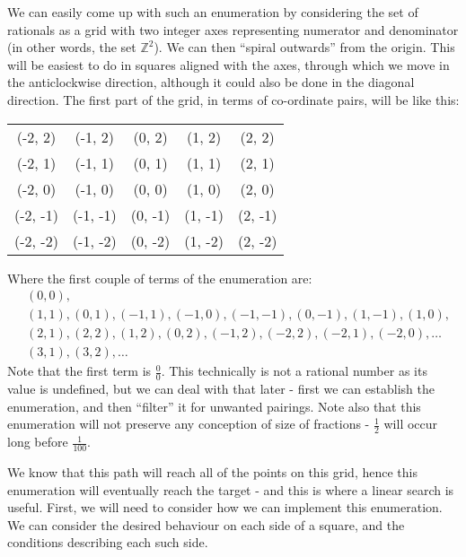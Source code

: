 \documentclass[fleqn,a4paper,11pt]{article}
\begin{document}
    We can easily come up with such an enumeration by considering the set of
    rationals as a grid with two integer axes representing numerator and
    denominator (in other words, the set $\mathbb{Z}^2$). We can then ``spiral
    outwards'' from the origin. This will be easiest to do in squares aligned
    with the axes, through which we move in the anticlockwise direction,
    although it could also be done in the diagonal direction.  The first part of
    the grid, in terms of co-ordinate pairs, will be like this:
    \begin{center}
        \begin{tabular}{ c c c c c }
            (-2, 2) & (-1, 2) & (0, 2) & (1, 2) & (2, 2) \\
            (-2, 1) & (-1, 1) & (0, 1) & (1, 1) & (2, 1) \\
            (-2, 0) & (-1, 0) & (0, 0) & (1, 0) & (2, 0) \\
            (-2, -1) & (-1, -1) & (0, -1) & (1, -1) & (2, -1) \\
            (-2, -2) & (-1, -2) & (0, -2) & (1, -2) & (2, -2) \\
        \end{tabular}
    \end{center}
    Where the first couple of terms of the enumeration are:
    \begin{equation}
        \begin{split}
        &(0, 0), \\
        &(1, 1), (0, 1), (-1, 1), (-1, 0), (-1, -1), (0, -1), (1, -1), (1, 0), \\
        &(2, 1), (2, 2), (1, 2), (0, 2), (-1, 2), (-2, 2), (-2, 1), (-2, 0), \ldots \\
        &(3, 1), (3, 2), \ldots
        \end{split}
    \end{equation}
    Note that the first term is $\frac{0}{0}$. This technically is not a
    rational number as its value is undefined, but we can deal with that later
    - first we can establish the enumeration, and then ``filter'' it for
    unwanted pairings. Note also that this enumeration will not preserve any
    conception of size of fractions - $\frac{1}{2}$ will occur long before
    $\frac{1}{100}$.

    We know that this path will reach all of the points on this grid, hence this
    enumeration will eventually reach the target - and this is where a linear
    search is useful. First, we will need to consider how we can implement this
    enumeration. We can consider the desired behaviour on each side of a square,
    and the conditions describing each such side.
\end{document}

